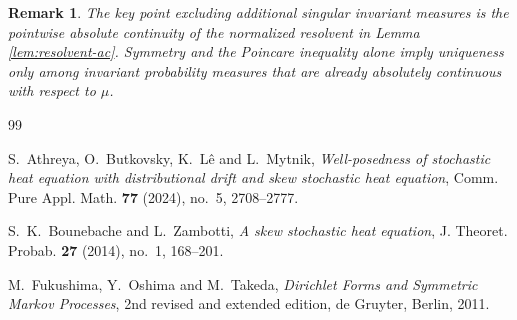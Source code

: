 \documentclass[12pt]{article}
\numberwithin{equation}{section}
\newtheorem{remark}[theorem]{Remark}
\newcommand{\1}{\mathbf 1}
\begin{document}
\begin{remark}
The key point excluding additional singular invariant measures is the pointwise
absolute continuity of the normalized resolvent in Lemma \ref{lem:resolvent-ac}.
Symmetry and the Poincare inequality alone imply uniqueness only among invariant
probability measures that are already absolutely continuous with respect to $\mu$.
\end{remark}

\begin{thebibliography}{99}

S.~Athreya, O.~Butkovsky, K.~L\^e and L.~Mytnik,
\emph{Well-posedness of stochastic heat equation with distributional drift and skew stochastic heat equation},
Comm. Pure Appl. Math. \textbf{77} (2024), no.~5, 2708--2777.

S.~K.~Bounebache and L.~Zambotti,
\emph{A skew stochastic heat equation},
J. Theoret. Probab. \textbf{27} (2014), no.~1, 168--201.

M.~Fukushima, Y.~Oshima and M.~Takeda,
\emph{Dirichlet Forms and Symmetric Markov Processes},
2nd revised and extended edition, de Gruyter, Berlin, 2011.

\end{thebibliography}
\end{document}
